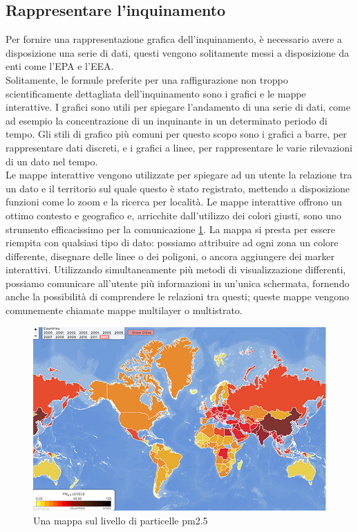 \subsection{Rappresentare l'inquinamento}
Per fornire una rappresentazione grafica dell’inquinamento, è necessario avere a disposizione una serie di dati, questi vengono solitamente messi a disposizione da enti come l'EPA e l'EEA.
\\ 
Solitamente, le formule preferite per una raffigurazione non troppo scientificamente dettagliata dell’inquinamento sono i grafici e le mappe interattive.
I grafici sono utili per spiegare l'andamento di una serie di dati, come ad esempio la concentrazione di un inquinante in un determinato periodo di tempo.
Gli stili di grafico più comuni per questo scopo sono i grafici a barre, per rappresentare dati discreti, e i grafici a linee, per rappresentare le varie rilevazioni di un dato nel tempo.
\\ 
Le mappe interattive vengono utilizzate per spiegare ad un utente la relazione tra un dato e il territorio sul quale questo è stato registrato, mettendo a disposizione funzioni come lo zoom e la ricerca per località.
Le mappe interattive offrono un ottimo contesto e geografico e, arricchite dall'utilizzo dei colori giusti, sono uno strumento efficacissimo per la comunicazione \ref{fig:pollution_map}.
La mappa si presta per essere riempita con qualsiasi tipo di dato: possiamo attribuire ad ogni zona un colore differente, disegnare delle linee o dei poligoni, o ancora aggiungere dei marker interattivi.
Utilizzando simultaneamente più metodi di visualizzazione differenti, possiamo comunicare all'utente più informazioni in un'unica schermata, fornendo anche la possibilità di comprendere le relazioni tra questi; queste mappe vengono comunemente chiamate mappe multilayer o multistrato.
\begin{figure}[H]
  \includegraphics[width=\linewidth]{img/mappapm.png}
  \caption{Una mappa sul livello di particelle pm2.5}
  \label{fig:pollution_map}
\end{figure}


